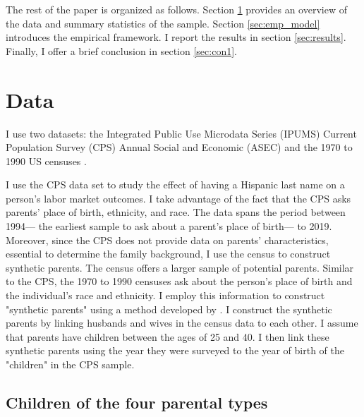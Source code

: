 \documentclass{wptemp}
\begin{document}
The rest of the paper is organized as follows. Section \ref{sec:data} provides an overview of the data and summary statistics of the sample. Section \ref{sec:emp_model} introduces the empirical framework. I report the results in section \ref{sec:results}. Finally, I offer a brief conclusion in section \ref{sec:con1}.

\section{Data}\label{sec:data}

I use two datasets:  the Integrated Public Use Microdata Series (IPUMS) Current Population Survey (CPS) Annual Social and Economic (ASEC) \citep{cps2019} and the 1970 to 1990 US censuses \citep{acs2019}. 

I use the CPS data set to study the effect of having a Hispanic last name on a person's labor market outcomes. I take advantage of the fact that the CPS asks parents' place of birth, ethnicity, and race. The data spans the period between 1994--- the earliest sample to ask about a parent's place of birth--- to 2019. Moreover, since the CPS does not provide data on parents' characteristics, essential to determine the family background, I use the census to construct synthetic parents. The census offers a larger sample of potential parents. Similar to the CPS, the 1970 to 1990 censuses ask about the person's place of birth and the individual's race and ethnicity. I employ this information to construct "synthetic parents" using a method developed by \citet{rubinstein2014pride}. I construct the synthetic parents by linking husbands and wives in the census data to each other. I assume that parents have children between the ages of 25 and 40. I then link these synthetic parents using the year they were surveyed to the year of birth of the "children" in the CPS sample.

\subsection{Children of the four parental types}
\end{document}
